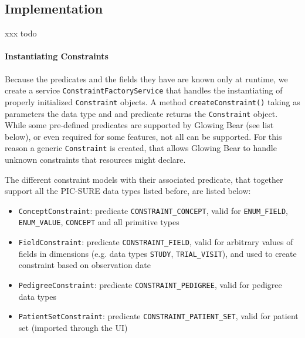 
\subsection*{Implementation}
xxx todo



\paragraph{Instantiating Constraints}
\label{sec:gb-instanciating-constraints}

Because the predicates and the fields they have are known only at runtime, we create a service \verb|ConstraintFactoryService| that handles the instantiating of properly initialized \verb|Constraint| objects.
A method \verb|createConstraint()| taking as parameters the data type and and predicate returns the \verb|Constraint| object.
While some pre-defined predicates are supported by Glowing Bear (see list below), or even required for some features, not all can be supported. 
For this reason a generic \verb|Constraint| is created, that allows Glowing Bear to handle unknown constraints that resources might declare.

The different constraint models with their associated predicate, that together support all the PIC-SURE data types listed before, are listed below:
\begin{itemize}
    \item \verb|ConceptConstraint|: predicate \verb|CONSTRAINT_CONCEPT|, valid for \verb|ENUM_FIELD|, \verb|ENUM_VALUE|, \verb|CONCEPT| and all primitive types 
    \item \verb|FieldConstraint|: predicate \verb|CONSTRAINT_FIELD|, valid for arbitrary values of fields in dimensions (e.g. data types \verb|STUDY|, \verb|TRIAL_VISIT|), and used to create constraint based on observation date
    \item \verb|PedigreeConstraint|: predicate \verb|CONSTRAINT_PEDIGREE|, valid for pedigree data types
    \item \verb|PatientSetConstraint|: predicate \verb|CONSTRAINT_PATIENT_SET|, valid for patient set (imported through the UI)
\end{itemize}

